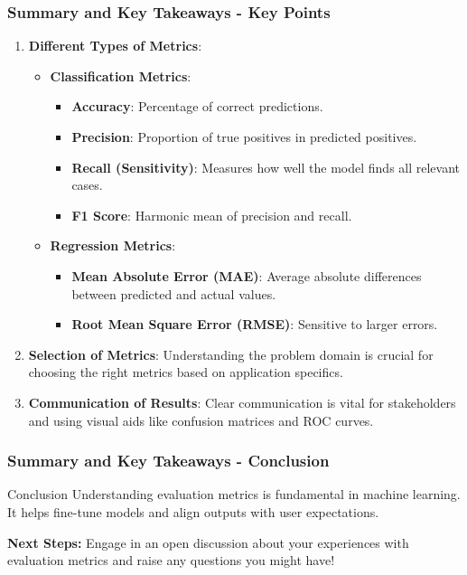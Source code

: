 \documentclass[aspectratio=169]{beamer}
\begin{document}
\begin{frame}[fragile]
    \frametitle{Summary and Key Takeaways - Key Points}
    \begin{enumerate}
        \item \textbf{Different Types of Metrics}:
            \begin{itemize}
                \item \textbf{Classification Metrics}:
                    \begin{itemize}
                        \item \textbf{Accuracy}: Percentage of correct predictions.
                        \item \textbf{Precision}: Proportion of true positives in predicted positives.
                        \item \textbf{Recall (Sensitivity)}: Measures how well the model finds all relevant cases.
                        \item \textbf{F1 Score}: Harmonic mean of precision and recall.
                    \end{itemize}
                
                \item \textbf{Regression Metrics}:
                    \begin{itemize}
                        \item \textbf{Mean Absolute Error (MAE)}: Average absolute differences between predicted and actual values.
                        \item \textbf{Root Mean Square Error (RMSE)}: Sensitive to larger errors.
                    \end{itemize}
            \end{itemize}
        \item \textbf{Selection of Metrics}:
            Understanding the problem domain is crucial for choosing the right metrics based on application specifics.
        \item \textbf{Communication of Results}:
            Clear communication is vital for stakeholders and using visual aids like confusion matrices and ROC curves.
    \end{enumerate}
\end{frame}

\begin{frame}[fragile]
    \frametitle{Summary and Key Takeaways - Conclusion}
    \begin{block}{Conclusion}
        Understanding evaluation metrics is fundamental in machine learning. It helps fine-tune models and align outputs with user expectations.
    \end{block}
    \textbf{Next Steps:} Engage in an open discussion about your experiences with evaluation metrics and raise any questions you might have!
\end{frame}
\end{document}
